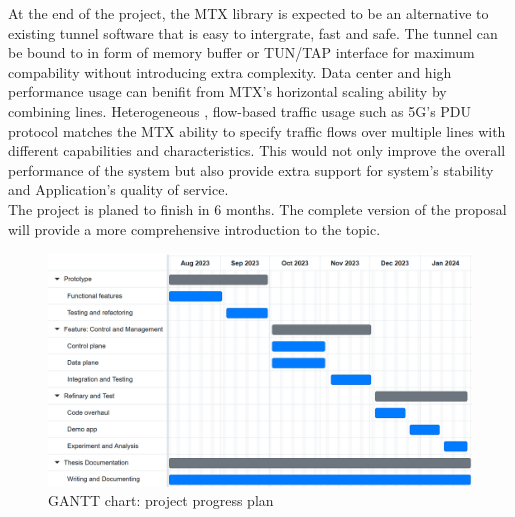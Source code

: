 \documentclass{article} %
\begin{document}
At the end of the project, the MTX library is expected to be an alternative to existing tunnel software that is easy to intergrate, fast and safe.
The tunnel can be bound to in form of memory buffer or TUN/TAP interface for maximum compability without introducing extra complexity.
Data center and high performance usage can benifit from MTX's horizontal scaling ability by combining lines.
Heterogeneous , flow-based traffic usage such as 5G's PDU protocol matches the MTX ability to specify traffic flows over multiple lines with different capabilities and characteristics.
This would not only improve the overall performance of the system but also provide extra support for system's stability and Application's quality of service.
\\


The project is planed to finish in 6 months.
The complete version of the proposal will provide a more comprehensive introduction to the topic.

\begin{figure}
	\centering
	\includegraphics[width=1.0\textwidth]{resources/images/mini_gannt.PNG}
	\caption{GANTT chart: project progress plan}
\end{figure}
\end{document}
